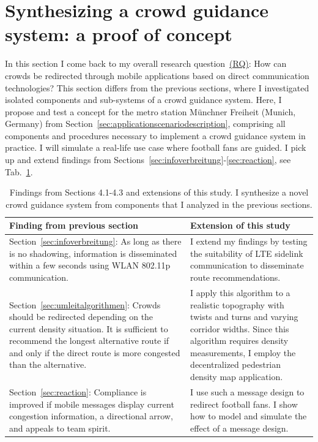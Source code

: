 \section{Synthesizing a crowd guidance system: a proof of concept}
\label{sec:realistiscscenario}
In this section I come back to my overall research question~\hyperref[reserachquestions]{(RQ)}: How can crowds be redirected through mobile applications based on direct communication technologies? 
%
This section differs from the previous sections, where I investigated isolated components and sub-systems of a crowd guidance system. Here, I propose and test a concept for the metro station Münchner Freiheit (Munich, Germany) from Section~\ref{sec:applicationscenariodescription}, comprising all components and procedures necessary to implement a crowd guidance system in practice. 
I will simulate a real-life use case where football fans are guided. I pick up and extend findings from Sections~\ref{sec:infoverbreitung}-\ref{sec:reaction}, see Tab.~\ref{tab:overviewfindings}.


\begin{table}[hbt!]
\begin{tabular}{p{}p{}}
\toprule
 Finding from previous section & Extension of this study \\ \midrule
 Section~\ref{sec:infoverbreitung}: \newline As long as there is no shadowing, information is disseminated within a few seconds using WLAN 802.11p communication.  & I extend my findings by testing the suitability of LTE sidelink communication to disseminate route recommendations.       \\ \hline
Section~\ref{sec:umleitalgorithmen}: \newline     Crowds should be redirected depending on the current density situation. It is sufficient to recommend the longest alternative route if and only if the direct route is more congested than the alternative.     & 
I apply this algorithm to a realistic topography with twists and turns and varying corridor widths.     
Since this algorithm requires density measurements, I employ the decentralized pedestrian density map application.    
    \\ \hline
 Section~\ref{sec:reaction}: \newline  Compliance is improved if mobile messages display current congestion information, a directional arrow, and appeals to team spirit.     & I use such a message design to redirect football fans. I show how to model and simulate the effect of a message design.         \\
  
 \bottomrule
\end{tabular}
\caption[Findings from Sections 4.1-4.3 and planned extensions]{Findings from Sections 4.1-4.3 and extensions of this study. I synthesize a novel crowd guidance system from components that I analyzed in the previous sections. }
\label{tab:overviewfindings}
\end{table}



